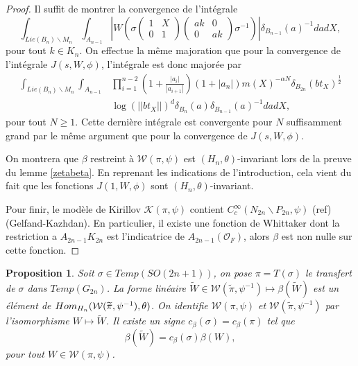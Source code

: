 \documentclass{amsart}
\newtheorem{proposition}{Proposition}[section]
\DeclareMathOperator{\Hom}{\mathnormal{Hom}}
\begin{document}
\begin{proof}
Il suffit de montrer la convergence de l'intégrale
\begin{equation}
\int_{Lie(B_n) \backslash M_n} \int_{A_{n-1}} \left|W\left(\sigma \begin{pmatrix}
1 & X \\
0 & 1
\end{pmatrix} \begin{pmatrix}
ak & 0 \\
0 & ak
\end{pmatrix}\sigma^{-1}\right)\right| \delta_{B_{n-1}}(a)^{-1} da dX,
\end{equation}
pour tout $k \in K_n$. On effectue la même majoration que pour la convergence de l'intégrale $J(s,W,\phi)$, l'intégrale est donc majorée par
\begin{equation}
\begin{split}
\int_{Lie(B_n) \backslash M_n} \int_{A_{n-1}} &\prod_{i=1}^{n-2}(1+\frac{|a_i|}{|a_{i+1}|}) (1+|a_n|) m(X)^{-\alpha N} \delta_{B_{2n}}(bt_X)^{\frac{1}{2}} \\
&\log(||bt_X||)^d \delta_{B_n}(a) \delta_{B_{n-1}}(a)^{-1} da dX,
\end{split}
\end{equation}
pour tout $N \geq 1$. Cette dernière intégrale est convergente pour $N$ suffisamment grand par le même argument que pour la convergence de $J(s,W,\phi)$.

On montrera que $\beta$ restreint à $\mathcal{W}(\pi, \psi)$ est $(H_n, \theta)$-invariant lors de la preuve du lemme \ref{zetabeta}. En reprenant les indications de l'introduction, cela vient du fait que les fonctions $J(1, W, \phi)$ sont $(H_n, \theta)$-invariant.

Pour finir, le modèle de Kirillov $\mathcal{K}(\pi, \psi)$ contient $C^\infty_c(N_{2n} \backslash P_{2n}, \psi)$ (ref)(Gelfand-Kazhdan). En particulier, il existe une fonction de Whittaker dont la restriction a $A_{2n-1}K_{2n}$ est l'indicatrice de $A_{2n-1}(\mathcal{O}_F)$, alors $\beta$ est non nulle sur cette fonction.
\end{proof}

\begin{proposition}
\label{constbeta}
Soit $\sigma \in Temp(SO(2n+1))$, on pose $\pi = T(\sigma)$ le transfert de $\sigma$ dans $Temp(G_{2n})$. La forme linéaire $\widetilde{W} \in \mathcal{W}(\widetilde{\pi}, \psi^{-1}) \mapsto \beta(\widetilde{W})$ est un élément de $\Hom_{H_n}(\mathcal{W}(\widetilde{\pi}, \psi^{-1}), \theta)$. On identifie $\mathcal{W}(\pi, \psi)$ et $\mathcal{W}(\widetilde{\pi}, \psi^{-1})$ par l'isomorphisme $W \mapsto \widetilde{W}$. Il existe un signe $c_\beta(\sigma) = c_\beta(\pi)$ tel que
\begin{equation}
\beta(\widetilde{W}) = c_\beta(\sigma)\beta(W),
\end{equation}
pour tout $W \in \mathcal{W}(\pi, \psi)$.
\end{proposition}
\end{document}
